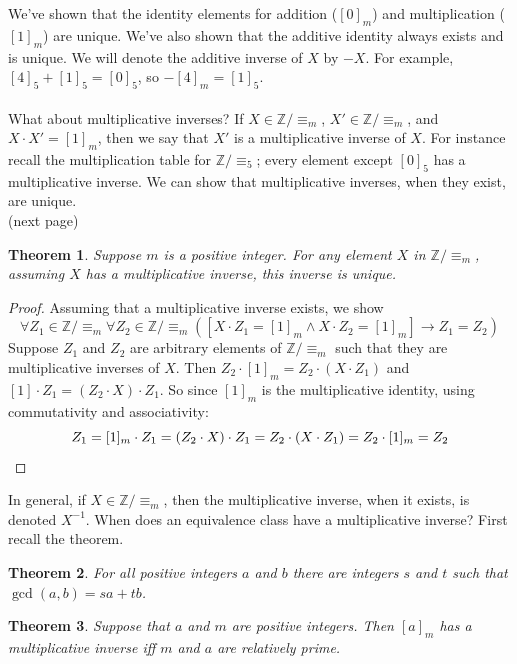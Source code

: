 \documentclass{report}
\newtheorem*{theorem}{Theorem}
\theoremstyle{definition}
\begin{document}
\noindent We've shown that the identity elements for addition ($[0]_m$) and multiplication ($[1]_m$) are unique. We've also shown that the additive identity always exists and is unique. We will
denote the additive inverse of $X$ by $-X$. For example, $[4]_5+[1]_5=[0]_5$, so $-[4]_m=[1]_5$.\\
\vspace{1mm}\\
What about multiplicative inverses? If $X\in\mathbb Z/\equiv_m$, $X'\in\mathbb Z/\equiv_m$, and $X\cdot X'=[1]_m$, then we say that $X'$ is a multiplicative inverse of $X$. For instance recall
the multiplication table for $\mathbb Z/\equiv_5$; every element except $[0]_5$ has a multiplicative inverse. We can show that multiplicative inverses, when they exist, are unique.\\
(next page)\newpage
\begin{theorem}
Suppose $m$ is a positive integer. For any element $X$ in $\mathbb Z/\equiv_m$, assuming $X$ has a multiplicative inverse, this inverse is unique.
\end{theorem}
\begin{proof}
Assuming that a multiplicative inverse exists, we show 
\begin{equation*}
\forall Z_1\in\mathbb Z/\equiv_m\forall Z_2\in\mathbb Z/\equiv_m([X\cdot Z_1=[1]_m\land
X\cdot Z_2=[1]_m]\to Z_1=Z_2)
\end{equation*}
Suppose $Z_1$ and $Z_2$ are arbitrary elements of $\mathbb Z/\equiv_m$ such that they are multiplicative inverses of $X$.
Then $Z_2\cdot[1]_m=Z_2\cdot(X\cdot Z_1)$ and $[1]\cdot Z_1=(Z_2\cdot X)\cdot Z_1$. So since $[1]_m$ is the multiplicative identity, using commutativity and associativity:
\begin{equation*}
Z_1=[1]_m\cdot Z_1=(Z_2\cdot X)\cdot Z_1=Z_2\cdot(X\cdot Z_1)=Z_2\cdot[1]_m=Z_2\qedhere
\end{equation*}
\end{proof}
\noindent In general, if $X\in\mathbb Z/\equiv_m$, then the multiplicative inverse, when it exists, is denoted $X^{-1}$. 
When does an equivalence class have a multiplicative inverse? First recall the theorem.
\begin{theorem}
For all positive integers $a$ and $b$ there are integers $s$ and $t$ such that $\gcd(a,b)=sa+tb$.
\end{theorem}
\begin{theorem}
Suppose that $a$ and $m$ are positive integers. Then $[a]_m$ has a multiplicative inverse iff $m$ and $a$ are relatively prime.
\end{theorem}
\end{document}
